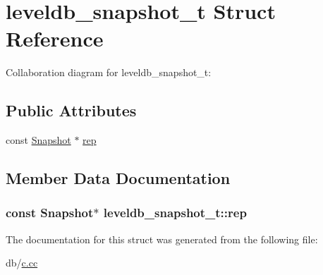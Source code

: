 \hypertarget{structleveldb__snapshot__t}{\section{leveldb\-\_\-snapshot\-\_\-t Struct Reference}
\label{structleveldb__snapshot__t}
}


Collaboration diagram for leveldb\-\_\-snapshot\-\_\-t\-:
\subsection*{Public Attributes}
\begin{DoxyCompactItemize}
\item 
const \hyperlink{classleveldb_1_1_snapshot}{Snapshot} $\ast$ \hyperlink{structleveldb__snapshot__t_a36f57ffdcd88fa73322d8e2e637e3b6a}{rep}
\end{DoxyCompactItemize}


\subsection{Member Data Documentation}
\hypertarget{structleveldb__snapshot__t_a36f57ffdcd88fa73322d8e2e637e3b6a}{
\subsubsection[{rep}]{\setlength{\rightskip}{0pt plus 5cm}const {\bf Snapshot}$\ast$ leveldb\-\_\-snapshot\-\_\-t\-::rep}}\label{structleveldb__snapshot__t_a36f57ffdcd88fa73322d8e2e637e3b6a}


The documentation for this struct was generated from the following file\-:\begin{DoxyCompactItemize}
\item 
db/\hyperlink{c_8cc}{c.\-cc}\end{DoxyCompactItemize}
